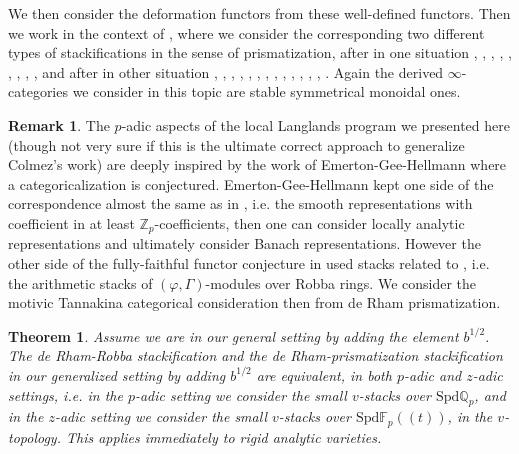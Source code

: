 \documentclass[12pt]{article}
\newtheorem{theorem}{Theorem}
\theoremstyle{definition}
\newtheorem{remark}{Remark}
\begin{document}
We then consider the deformation functors from these well-defined functors. Then we work in the context of \cite{1S5}, \cite{1S6} where we consider the corresponding two different types of stackifications in the sense of prismatization, after in one situation \cite{1To1}, \cite{1To2}, \cite{1To3}, \cite{1To4}, \cite{1S4}, \cite{1ALBRCS}, \cite{1BS}, \cite{1D}, \cite{1BL}, and after in other situation \cite{1KL}, \cite{1KL1}, \cite{1S1}, \cite{1S2}, \cite{1S3}, \cite{1F1}, \cite{1F2}, \cite{1T1}, \cite{1CSA}, \cite{1CSB}, \cite{1CS}, \cite{1BS1}, \cite{1BL1}, \cite{1BL2}. Again the derived $\infty$-categories we consider in this topic are stable symmetrical monoidal ones. 

\begin{remark}
The $p$-adic aspects of the local Langlands program we presented here (though not very sure if this is the ultimate correct approach to generalize Colmez's work) are deeply inspired by the work of Emerton-Gee-Hellmann \cite{EGH1} where a categoricalization is conjectured. Emerton-Gee-Hellmann kept one side of the correspondence almost the same as in \cite{1FS}, i.e. the smooth representations with coefficient in at least $\mathbb{Z}_p$-coefficients, then one can consider locally analytic representations and ultimately consider Banach representations. However the other side of the fully-faithful functor conjecture in \cite{EGH1} used stacks related to \cite{KPX}, i.e. the arithmetic stacks of $(\varphi,\Gamma)$-modules over Robba rings. We consider the motivic Tannakina categorical consideration then from de Rham prismatization. 
\end{remark}

\begin{theorem}
Assume we are in our general setting by adding the element $b^{1/2}$. The de Rham-Robba stackification and the de Rham-prismatization stackification in our generalized setting by adding $b^{1/2}$ are equivalent, in both $p$-adic and $z$-adic settings, i.e. in the $p$-adic setting we consider the small $v$-stacks over $\mathrm{Spd}\mathbb{Q}_p$, and in the $z$-adic setting we consider the small $v$-stacks over $\mathrm{Spd}\mathbb{F}_p((t))$, in the $v$-topology. This applies immediately to rigid analytic varieties.
\end{theorem}
\end{document}
